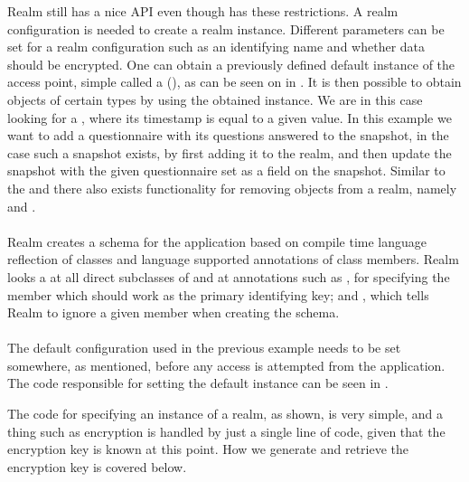 Realm still has a nice API even though has these restrictions. A realm configuration is needed to create a realm instance. Different parameters can be set for a realm configuration such as an identifying name and whether data should be encrypted. One can obtain a previously defined default instance of the access point, simple called a (), as can be seen on  in . It is then possible to obtain objects of certain types by using the obtained instance. We are in this case looking for a , where its timestamp is equal to a given value. In this example we want to add a questionnaire with its questions answered to the snapshot, in the case such a snapshot exists, by first adding it to the realm, and then update the snapshot with the given questionnaire set as a field on the snapshot. Similar to the  and  there also exists functionality for removing objects from a realm, namely  and .
\\\\
Realm creates a schema for the application based on compile time language reflection of classes and language supported annotations of class members. Realm looks a at all direct subclasses of  and at annotations such as , for specifying the member which should work as the primary identifying key; and , which tells Realm to ignore a given member when creating the schema.
\\\\
The default configuration used in the previous example needs to be set somewhere, as mentioned, before any access is attempted from the application. The code responsible for setting the default instance can be seen in . 


\FloatBarrier

The code for specifying an instance of a realm, as shown, is very simple, and a thing such as encryption is handled by just a single line of code, given that the encryption key is known at this point. How we generate and retrieve the encryption key is covered below. 

